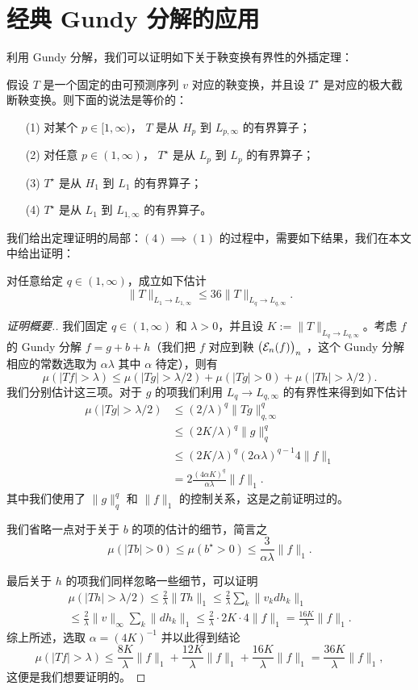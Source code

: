 \section{经典 Gundy 分解的应用}
  利用 Gundy 分解，我们可以证明如下关于鞅变换有界性的外插定理\cite{hytonen2016analysis}：
\begin{theorem}
假设 $T$ 是一个固定的由可预测序列 $v$ 对应的鞅变换，并且设 $T^\star$ 是对应的极大截断鞅变换。则下面的说法是等价的：
\begin{itemize}
  \item[(1)] 对某个 $p\in[1,\infty)$， $T$ 是从 $H_p$ 到 $L_{p,\infty}$ 的有界算子；
  \item[(2)] 对任意 $p\in(1,\infty)$， $T^\star$ 是从 $L_p$ 到 $L_p$ 的有界算子；
  \item[(3)] $T^\star$ 是从 $H_1$ 到 $L_1$ 的有界算子；
  \item[(4)] $T^\star$ 是从 $L_1$ 到 $L_{1,\infty}$ 的有界算子。
\end{itemize}
\end{theorem}
我们给出定理证明的局部：$(4)\implies(1)$ 的过程中，需要如下结果，我们在本文中给出证明：
\begin{proposition}
对任意给定 $q\in(1,\infty)$，成立如下估计
  \[  \|T\|_{L_1\to L_{1,\infty}}\leq36 \|T\|_{L_q\to L_{q,\infty}}.\]
\end{proposition}

\begin{proof}[证明概要.]
我们固定 $q\in(1,\infty)$ 和 $\lambda>0$，并且设 $K:=\|T\|_{L_q\to L_{q,\infty}}$。考虑 $f$ 的 Gundy 分解 $f=g+b+h$（我们把 $f$ 对应到鞅 $\bigl(\mathcal{E}_n(f)\bigr)_{n}$ ，这个 Gundy 分解相应的常数选取为 $\alpha\lambda$ 其中 $\alpha$ 待定），则有
  \[\mu(|Tf|>\lambda)\leq\mu(|Tg|>\lambda/2)+\mu(|Tg|>0)+\mu(|Th|>\lambda/2).\]
我们分别估计这三项。对于 $g$ 的项我们利用 $L_q\to L_{q,\infty}$ 的有界性来得到如下估计
\begin{align*}
  \mu(|Tg|>\lambda/2)  &\leq (2/\lambda)^q\|Tg\|_{q,\infty}^q\\
  &\leq (2K/\lambda)^q\|g\|_{q}^{q}\\
  &\leq (2K/\lambda)^q(2\alpha\lambda)^{q-1}4\|f\|_1\\
  &=2\frac{(4\alpha K)^{q}}{\alpha\lambda}\|f\|_1.
\end{align*}
其中我们使用了 $\|g\|_q^q$ 和 $\|f\|_1$ 的控制关系，这是之前证明过的。
\par 我们省略一点对于关于 $b$ 的项的估计的细节，简言之
  \[\mu(|Tb|>0)\leq \mu( b^\star>0)\leq \frac{3}{\alpha\lambda}\|f\|_1.\]
\par 最后关于 $h$ 的项我们同样忽略一些细节，可以证明
  \begin{align*}
    \mu(|Th|>\lambda/2)\leq \frac{2}{\lambda}\|Th\|_1\leq\frac{2}{\lambda}\sum_{k}\|v_kdh_k\|_1\\
    \leq\frac{2}{\lambda}\|v\|_\infty\sum_{k}\|dh_k\|_1\leq\frac{2}{\lambda}\cdot 2K\cdot 4\|f\|_1=\frac{16K}{\lambda}\|f\|_1.
  \end{align*}
综上所述，选取 $\alpha=(4K)^{-1}$ 并以此得到结论
  \[\mu(|Tf|>\lambda)\leq \frac{8K}{\lambda}\|f\|_1+\frac{12K}{\lambda}\|f\|_1+\frac{16K}{\lambda}\|f\|_1=\frac{36K}{\lambda}\|f\|_1,\]
这便是我们想要证明的。
\end{proof}


